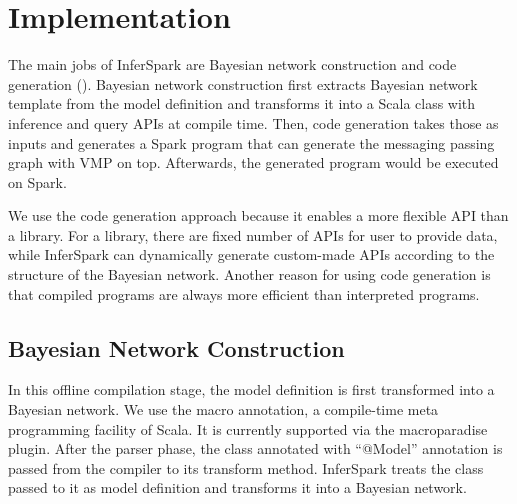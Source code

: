 \section{Implementation}
\label{sec:implementation}
The main jobs of InferSpark are Bayesian network construction and  code generation ().
Bayesian network construction first extracts Bayesian network template from the model definition and transforms it into a
Scala class with inference and query APIs at compile time. 
Then, code generation takes those as inputs and generates a Spark program
that can generate the messaging passing graph with VMP on top.
Afterwards, the generated program would be executed on Spark.

We use the code generation approach because it enables a more flexible API
than a library. For a library, there are fixed number of APIs for user to
provide data, while InferSpark can dynamically generate custom-made APIs 
according to the structure of the Bayesian network. 
Another reason for using code generation is
that compiled programs are always more efficient than interpreted programs.



\subsection{Bayesian Network Construction}\label{bnc}

In this offline compilation stage, the model definition is first transformed into a Bayesian network.
We use the macro annotation, a compile-time meta programming facility of
Scala.  It is currently supported via the macroparadise plugin. After the
parser phase, the class annotated with ``{\sf @Model}'' annotation is passed from the
compiler to its transform method. InferSpark treats the class passed to it as
model definition and transforms it into a Bayesian network.

